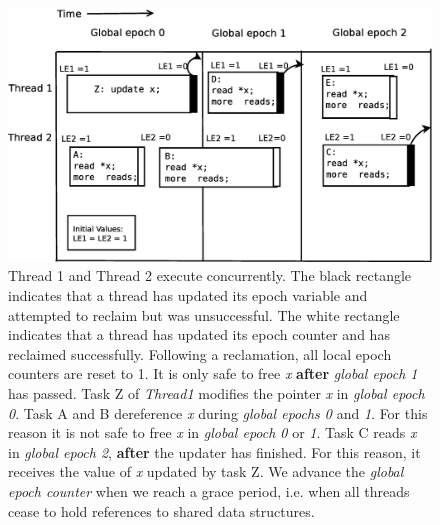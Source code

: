 \documentclass[a4paper]{article}
\begin{document}
\begin{figure}[float=tph]
\begin{center}
\includegraphics[scale=0.36]{../images/diagrams/rcuexp2}
\caption{Thread 1 and Thread 2 execute concurrently. 
The black rectangle indicates that a thread has updated its epoch variable and attempted to reclaim but was unsuccessful. The white rectangle indicates that a thread has updated its epoch counter and has reclaimed successfully. Following a reclamation, all local epoch counters are reset to 1. 
It is only safe to free \emph{x}  \textbf{after} \emph{global epoch 1} has passed. Task Z of \emph{Thread1} modifies the pointer \emph{x} in \emph{global epoch 0}. Task A and B dereference \emph{x} during \emph{global epochs 0} and \emph{1}. For this reason it is not safe to free \emph{x} in \emph{global epoch 0} or \emph{1}. Task C reads \emph{x} in \emph{global epoch 2}, \textbf{after} the updater has finished. For this reason, it receives the value of \emph{x} updated by task Z. We advance the \emph{global epoch counter} when we reach a grace period, i.e. when all threads cease to hold references to shared data structures.}
\label{fig:rcuexp2}
\end{center}
\end{figure}
\end{document}
